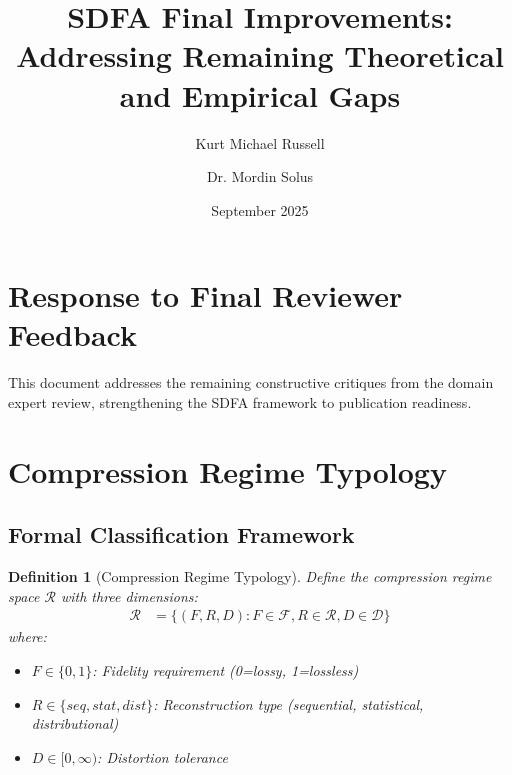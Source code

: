 \documentclass[11pt]{article}
\title{SDFA Final Improvements: Addressing Remaining Theoretical and Empirical Gaps}
\author{Kurt Michael Russell \and Dr. Mordin Solus}
\date{September 2025}
\newtheorem{definition}{Definition}
\begin{document}
\maketitle

\section{Response to Final Reviewer Feedback}

This document addresses the remaining constructive critiques from the domain expert review, strengthening the SDFA framework to publication readiness.

\section{Compression Regime Typology}

\subsection{Formal Classification Framework}

\begin{definition}[Compression Regime Typology]
Define the compression regime space $\mathcal{R}$ with three dimensions:
\begin{align}
\mathcal{R} &= \{(F, R, D) : F \in \mathcal{F}, R \in \mathcal{R}, D \in \mathcal{D}\}
\end{align}
where:
\begin{itemize}
    \item $F \in \{0, 1\}$: Fidelity requirement (0=lossy, 1=lossless)
    \item $R \in \{seq, stat, dist\}$: Reconstruction type (sequential, statistical, distributional)
    \item $D \in [0, \infty)$: Distortion tolerance
\end{itemize}
\end{definition}
\end{document}
